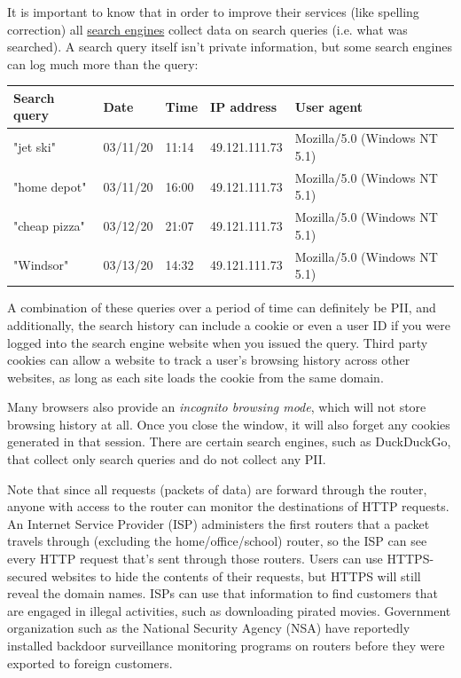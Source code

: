 \documentclass{article}
\begin{document}
  It is important to know that in order to improve their services (like spelling correction) all \hyperref[def:search-engine]{search engines} collect data on search queries (i.e. what was searched). A search query itself isn't private information, but some search engines can log much more than the query: 
  \begin{center}
  \begin{tabular}{l|l|l|l|l}
      Search query & Date & Time & IP address & User agent \\
      \hline 
      "jet ski" & 03/11/20 & 11:14 & 49.121.111.73 & Mozilla/5.0 (Windows NT 5.1) \\
      "home depot" & 03/11/20 & 16:00 & 49.121.111.73 & Mozilla/5.0 (Windows NT 5.1) \\
      "cheap pizza" & 03/12/20 & 21:07 & 49.121.111.73 & Mozilla/5.0 (Windows NT 5.1) \\
      "Windsor" & 03/13/20 & 14:32 & 49.121.111.73 & Mozilla/5.0 (Windows NT 5.1) 
  \end{tabular}
  \end{center}
  A combination of these queries over a period of time can definitely be PII, and additionally, the search history can include a cookie or even a user ID if you were logged into the search engine website when you issued the query. Third party cookies can allow a website to track a user's browsing history across other websites, as long as each site loads the cookie from the same domain. 

  Many browsers also provide an \textit{incognito browsing mode}, which will not store browsing history at all. Once you close the window, it will also forget any cookies generated in that session. There are certain search engines, such as DuckDuckGo, that collect only search queries and do not collect any PII.

  Note that since all requests (packets of data) are forward through the router, anyone with access to the router can monitor the destinations of HTTP requests. An Internet Service Provider (ISP) administers the first routers that a packet travels through (excluding the home/office/school) router, so the ISP can see every HTTP request that's sent through those routers. Users can use HTTPS-secured websites to hide the contents of their requests, but HTTPS will still reveal the domain names. ISPs can use that information to find customers that are engaged in illegal activities, such as downloading pirated movies. Government organization such as the National Security Agency (NSA) have reportedly installed backdoor surveillance monitoring programs on routers before they were exported to foreign customers. 
\end{document}
